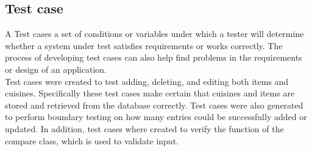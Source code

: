 \documentclass[12pt,a4paper]{article}
\newcommand\tab[1][.7cm]{\hspace*{#1}}
\begin{document}
	\subsection{Test case}
	\tab A Test cases a set of conditions or variables under which a tester will determine whether a system under test satisfies requirements or works correctly. The process of developing test cases can also help find problems in the requirements or design of an application.\\Test cases were created to test adding, deleting, and editing both items and cuisines. Specifically these test cases make certain that cuisines and items are stored and retrieved from the database correctly. Test cases were also generated to perform boundary testing on how many entries could be successfully added or updated. In addition, test cases where created to verify the function of the compare class, which is used to validate input.
\end{document}
